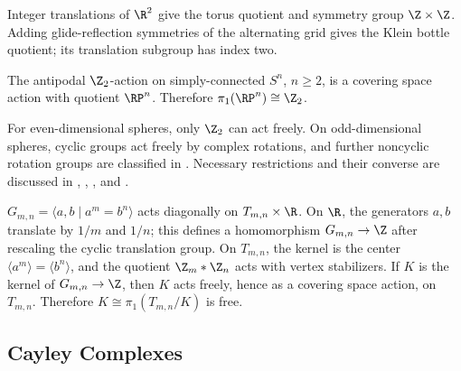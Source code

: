 \begin{example}
\label{ex:grid-symmetries-torus-klein-bottle}

Integer translations of $\R^2$ give the torus quotient and symmetry group
$\Z\times\Z$. Adding glide-reflection symmetries of the alternating grid gives
the Klein bottle quotient; its translation subgroup has index two.
\end{example}

\begin{example}
\label{ex:real-projective-space-covering}

The antipodal $\Z_2$-action on simply-connected $S^n$, $n\geq2$, is a
covering space action with quotient $\RP^n$. Therefore
$\pi_1(\RP^n)\cong\Z_2$.
\end{example}

For even-dimensional spheres, only $\Z_2$ can act freely. On odd-dimensional
spheres, cyclic groups act freely by complex rotations, and further noncyclic
rotation groups are classified in \cite{Wolf1984}. Necessary restrictions and
their converse are discussed in \cite{Milnor1957}, \cite{Brown1982},
\cite{MadsenThomasWall1976}, and \cite{DavisMilgram1985}.

\begin{example}
\label{ex:gmn-action-on-tree}

$G_{m,n}=\langle a,b\mid a^m=b^n\rangle$ acts diagonally on
$T_{m,n}\times\R$. On $\R$, the generators $a,b$ translate by $1/m$ and
$1/n$; this defines a homomorphism $G_{m,n}\to\Z$ after rescaling the cyclic
translation group. On $T_{m,n}$, the kernel is the center
$\langle a^m\rangle=\langle b^n\rangle$, and the quotient $\Z_m*\Z_n$ acts
with vertex stabilizers. If $K$ is the kernel of $G_{m,n}\to\Z$, then $K$
acts freely, hence as a covering space action, on $T_{m,n}$. Therefore
$K\cong\pi_1(T_{m,n}/K)$ is free.
\end{example}

\subsection*{Cayley Complexes}

